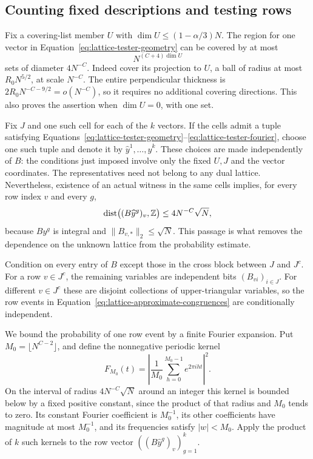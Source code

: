 \subsection{Counting fixed descriptions and testing rows}

Fix a covering-list member $U$ with
$\dim U\le(1-\alpha/3)N$.  The region for one vector in
Equation~\eqref{eq:lattice-tester-geometry} can be covered by at most
\begin{equation}\label{eq:lattice-net-size}
 N^{(C+4)\dim U}
\end{equation}
sets of diameter $4N^{-C}$.  Indeed cover its projection to $U$, a
ball of radius at most $R_0N^{5/2}$, at scale $N^{-C}$.
The entire perpendicular thickness is
$2R_0N^{-C-9/2}=o(N^{-C})$, so it requires no additional covering
directions.  This also proves the assertion when $\dim U=0$, with
one set.

Fix $J$ and one such cell for each of the $k$ vectors.  If the cells
admit a tuple satisfying
Equations~\eqref{eq:lattice-tester-geometry}--\eqref{eq:lattice-tester-fourier},
choose one such tuple and denote it by $\widehat y^1,\ldots,
\widehat y^k$.  These choices are made independently of $B$: the
conditions just imposed involve only the fixed $U,J$ and the vector
coordinates.  The representatives need not belong to any dual
lattice.  Nevertheless, existence of an actual witness in the same
cells implies, for every row index $v$ and every $g$,
\begin{equation}\label{eq:lattice-approximate-congruences}
 \operatorname{dist}\bigl((B\widehat y^g)_v,\mathbb Z\bigr)
       \le 4N^{-C}\sqrt N,
\end{equation}
because $By^g$ is integral and $\lVert B_{v,*}\rVert_2\le\sqrt N$.
This passage is what removes the dependence on the unknown lattice
from the probability estimate.

Condition on every entry of $B$ except those in the cross block
between $J$ and $J^c$.  For a row $v\in J^c$, the remaining variables
are independent bits $(B_{vi})_{i\in J}$.  For different $v\in J^c$
these are disjoint collections of upper-triangular variables, so the
row events in Equation~\eqref{eq:lattice-approximate-congruences}
are conditionally independent.

We bound the probability of one row event by a finite Fourier
expansion.  Put $M_0=\lfloor N^{C-2}\rfloor$, and define the
nonnegative periodic kernel
\[
 F_{M_0}(t)=\left|\frac1{M_0}
                   \sum_{h=0}^{M_0-1}e^{2\pi i ht}\right|^2.
\]
On the interval of radius $4N^{-C}\sqrt N$ around an integer this
kernel is bounded below by a fixed positive constant, since the
product of that radius and $M_0$ tends to zero.
Its constant Fourier coefficient is $M_0^{-1}$, its other
coefficients have magnitude at most $M_0^{-1}$, and its frequencies
satisfy $|w|<M_0$.  Apply the product of $k$ such kernels to the row
vector $((B\widehat y^g)_v)_{g=1}^k$.

